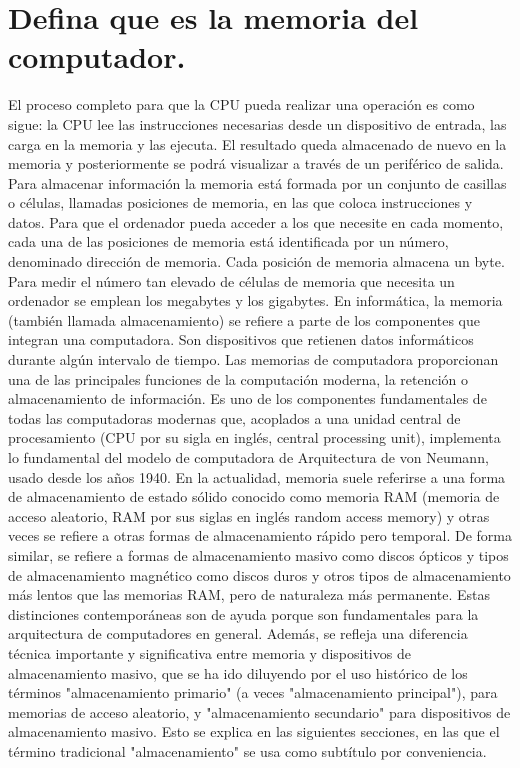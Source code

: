 \documentclass{article}
\begin{document}
\section{Defina que es la memoria del computador.}
El proceso completo para que la CPU pueda realizar una operación es como sigue: la CPU lee las instrucciones necesarias desde un dispositivo de entrada, las carga en la memoria y las ejecuta. El resultado queda almacenado de nuevo en la memoria y posteriormente se podrá visualizar a través de un periférico de salida. Para almacenar información la memoria está formada por un conjunto de casillas o células, llamadas posiciones de memoria, en las que coloca instrucciones y datos. Para que el ordenador pueda acceder a los que necesite en cada momento, cada una de las posiciones de memoria está identificada por un número, denominado dirección de memoria. Cada posición de memoria almacena un byte. Para medir el número tan elevado de células de memoria que necesita un ordenador se emplean los megabytes y los gigabytes. En informática, la memoria (también llamada almacenamiento) se refiere a parte de los componentes que integran una computadora. Son dispositivos que retienen datos informáticos durante algún intervalo de tiempo. Las memorias de computadora proporcionan una de las principales funciones de la computación moderna, la retención o almacenamiento de información. Es uno de los componentes fundamentales de todas las computadoras modernas que, acoplados a una unidad central de procesamiento (CPU por su sigla en inglés, central processing unit), implementa lo fundamental del modelo de computadora de Arquitectura de von Neumann, usado desde los años 1940. En la actualidad, memoria suele referirse a una forma de almacenamiento de estado sólido conocido como memoria RAM (memoria de acceso aleatorio, RAM por sus siglas en inglés random access memory) y otras veces se refiere a otras formas de almacenamiento rápido pero temporal. De forma similar, se refiere a formas de almacenamiento masivo como discos ópticos y tipos de almacenamiento magnético como discos duros y otros tipos de almacenamiento más lentos que las memorias RAM, pero de naturaleza más permanente. Estas distinciones contemporáneas son de ayuda porque son fundamentales para la arquitectura de computadores en general. Además, se refleja una diferencia técnica importante y significativa entre memoria y dispositivos de almacenamiento masivo, que se ha ido diluyendo por el uso histórico de los términos "almacenamiento primario" (a veces "almacenamiento principal"), para memorias de acceso aleatorio, y "almacenamiento secundario" para dispositivos de almacenamiento masivo. Esto se explica en las siguientes secciones, en las que el término tradicional "almacenamiento" se usa como subtítulo por conveniencia.
\end{document}
